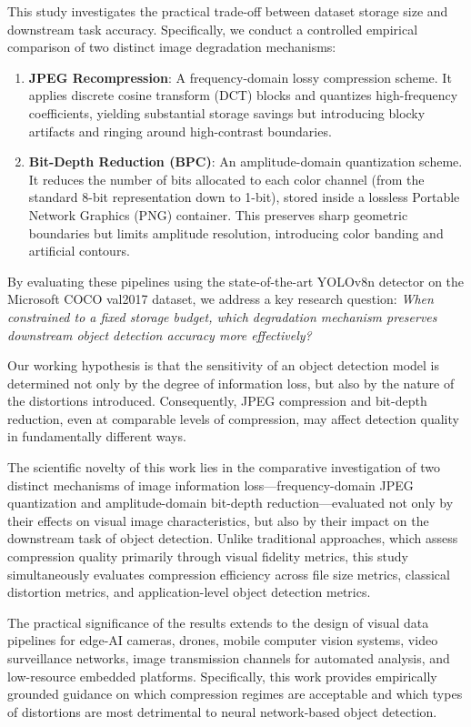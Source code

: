 \documentclass[12pt, a4paper]{article}
\begin{document}
This study investigates the practical trade-off between dataset storage size and downstream task accuracy. Specifically, we conduct a controlled empirical comparison of two distinct image degradation mechanisms:
\begin{enumerate}
    \item \textbf{JPEG Recompression}: A frequency-domain lossy compression scheme. It applies discrete cosine transform (DCT) blocks and quantizes high-frequency coefficients, yielding substantial storage savings but introducing blocky artifacts and ringing around high-contrast boundaries.
    \item \textbf{Bit-Depth Reduction (BPC)}: An amplitude-domain quantization scheme. It reduces the number of bits allocated to each color channel (from the standard 8-bit representation down to 1-bit), stored inside a lossless Portable Network Graphics (PNG) container. This preserves sharp geometric boundaries but limits amplitude resolution, introducing color banding and artificial contours.
\end{enumerate}

By evaluating these pipelines using the state-of-the-art YOLOv8n detector on the Microsoft COCO val2017 dataset, we address a key research question: \textit{When constrained to a fixed storage budget, which degradation mechanism preserves downstream object detection accuracy more effectively?}

Our working hypothesis is that the sensitivity of an object detection model is determined not only by the degree of information loss, but also by the nature of the distortions introduced. Consequently, JPEG compression and bit-depth reduction, even at comparable levels of compression, may affect detection quality in fundamentally different ways.

The scientific novelty of this work lies in the comparative investigation of two distinct mechanisms of image information loss---frequency-domain JPEG quantization and amplitude-domain bit-depth reduction---evaluated not only by their effects on visual image characteristics, but also by their impact on the downstream task of object detection. Unlike traditional approaches, which assess compression quality primarily through visual fidelity metrics, this study simultaneously evaluates compression efficiency across file size metrics, classical distortion metrics, and application-level object detection metrics.

The practical significance of the results extends to the design of visual data pipelines for edge-AI cameras, drones, mobile computer vision systems, video surveillance networks, image transmission channels for automated analysis, and low-resource embedded platforms. Specifically, this work provides empirically grounded guidance on which compression regimes are acceptable and which types of distortions are most detrimental to neural network-based object detection.
\end{document}

